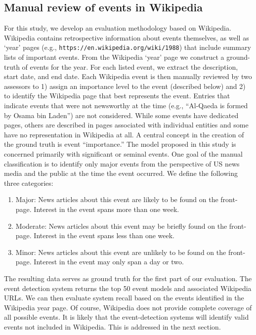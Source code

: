 \documentclass{sig-alternate}
\begin{document}
\subsection{Manual review of events in Wikipedia}
For this study, we develop an evaluation methodology based on Wikipedia. Wikipedia contains retrospective information about events themselves, as well as `year' pages (e.g., {\tt https://en.wikipedia.org/wiki/1988}) that include summary lists of important events.  From the Wikipedia `year' page we construct a ground-truth of events for the year.  For each listed event, we extract the description, start date, and end date. Each Wikipedia event is then manually reviewed by two assessors to 1) assign an importance level to the event (described below) and 2) to identify the Wikipedia page that best represents the event. Entries that indicate events that were not newsworthy at the time (e.g., ``Al-Qaeda is formed by Osama bin Laden'') are not considered.  While some events have dedicated pages, others are described in pages associated with individual entities and some have no representation in Wikipedia at all. 
A central concept in the creation of the ground truth is event ``importance.'' The model proposed in this study is concerned primarily with significant or seminal events. One goal of the manual classification is to identify only major events from the perspective of US news media and the public at the time the event occurred. We define the following three categories:
\begin{enumerate}
\item Major: News articles about this event are likely to be found on the front-page. Interest in the event spans more than one week.
\item Moderate: News articles about this event may be briefly found on the front-page. Interest in the event spans less than one week.
\item Minor: News articles about this event are unlikely to be found on the front-page. Interest in the event may only span a day or two.
\end{enumerate}

The resulting data serves as ground truth for the first part of our evaluation. The event detection system returns the top 50 event models and associated Wikipedia URLs. We can then evaluate system recall based on the events identified in the Wikipedia year page.  Of course, Wikipedia does not provide complete coverage of all possible events. It is likely that the event-detection systems will identify valid events not included in Wikipedia. This is addressed in the next section.
\end{document}
